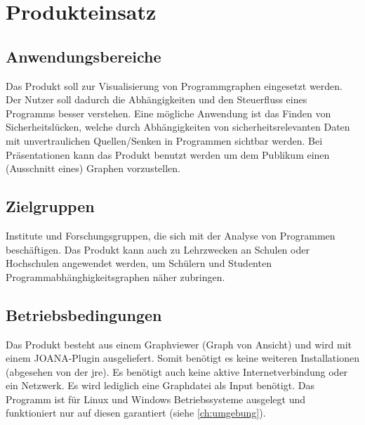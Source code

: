 \chapter{Produkteinsatz}\label{ch:einsatz}

\section{Anwendungsbereiche}
Das Produkt soll zur Visualisierung von Programmgraphen eingesetzt werden.
Der Nutzer soll dadurch die Abhängigkeiten und den Steuerfluss eines Programms besser verstehen.
Eine mögliche Anwendung ist das Finden von Sicherheitslücken, welche durch Abhängigkeiten von sicherheitsrelevanten Daten mit unvertraulichen Quellen/Senken in Programmen sichtbar werden.
Bei Präsentationen kann das Produkt benutzt werden um dem Publikum einen (Ausschnitt eines) Graphen vorzustellen.

\section{Zielgruppen}
Institute und Forschungsgruppen, die sich mit der Analyse von Programmen beschäftigen.
Das Produkt kann auch zu Lehrzwecken an Schulen oder Hochschulen angewendet werden, um Schülern und Studenten Programmabhänghigkeitsgraphen näher zubringen.

\section{Betriebsbedingungen}
Das Produkt besteht aus einem Graphviewer (Graph von Ansicht) und wird mit einem JOANA-Plugin ausgeliefert.
Somit benötigt es keine weiteren Installationen (abgesehen von der \gls{jre}).
Es benötigt auch keine aktive Internetverbindung oder ein Netzwerk.
Es wird lediglich eine Graphdatei als Input benötigt.
Das Programm ist für Linux und Windows Betriebssysteme ausgelegt und funktioniert nur auf diesen garantiert (siehe \autoref{ch:umgebung}).
